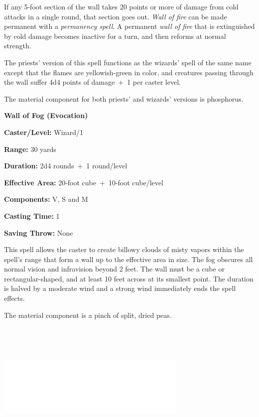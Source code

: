 \begin{multicols}{2}
If any 5-foot section of the wall takes 20 points or more of damage from cold attacks in a single round, that section goes out.  \textit{Wall of fire} can be made permanent with a \textit{permanency spell}.  A permanent \textit{wall of fire} that is extinguished by cold damage becomes inactive for a turn, and then reforms at normal strength.

The priests' version of this spell functions as the wizards' spell of the same name except that the flames are yellowish-green in color, and creatures passing through the wall suffer 4d4 points of damage~+~1 per caster level.  

The material component for both priests' and wizards' versions is phosphorus.

\vspace{1em}

\noindent
\begin{minipage}{\columnwidth}

\noindent \textbf{Wall of Fog (Evocation)}

\noindent \textbf{Caster/Level:} Wizard/1

\noindent \textbf{Range:} 30 yards

\noindent \textbf{Duration:} 2d4 rounds~+~1 round/level

\noindent \textbf{Effective Area:} 20-foot cube~+~10-foot cube/level

\noindent \textbf{Components:} V, S and M

\noindent \textbf{Casting Time:} 1

\noindent \textbf{Saving Throw:} None

\end{minipage}

This spell allows the caster to create billowy clouds of misty vapors within the spell's range that form a wall up to the effective area in size.  The fog obscures all normal vision and infravision beyond 2 feet.  The wall must be a cube or rectangular-shaped, and at least 10 feet across at its smallest point.  The duration is halved by a moderate wind and a strong wind immediately ends the spell effects.

The material component is a pinch of split, dried peas.

\noindent\includegraphics[width=3.6in, height=2.5in]{testblock.pdf}


\end{multicols}
